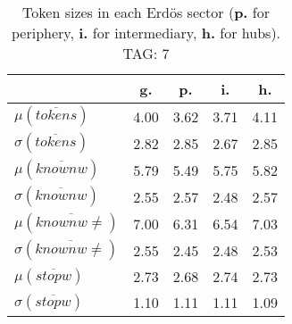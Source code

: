 \begin{table}[h!]
\begin{center}
\begin{tabular}{| l || c | c | c | c |}\hline
 & {\bf g.} & {\bf p.} & {\bf i.} & {\bf h.} \\\hline\hline
$\mu(\overline{tokens})$ & 4.00  & 3.62  & 3.71  & 4.11 \\
$\sigma(\overline{tokens})$ & 2.82  & 2.85  & 2.67  & 2.85 \\\hline
$\mu(\overline{knownw})$ & 5.79  & 5.49  & 5.75  & 5.82 \\
$\sigma(\overline{knownw})$ & 2.55  & 2.57  & 2.48  & 2.57 \\\hline
$\mu(\overline{knownw \neq})$ & 7.00  & 6.31  & 6.54  & 7.03 \\
$\sigma(\overline{knownw \neq})$ & 2.55  & 2.45  & 2.48  & 2.53 \\\hline
$\mu(\overline{stopw})$ & 2.73  & 2.68  & 2.74  & 2.73 \\
$\sigma(\overline{stopw})$ & 1.10  & 1.11  & 1.11  & 1.09 \\\hline
\end{tabular}
\caption{Token sizes in each Erd\"os sector ({{\bf p.}} for periphery, {{\bf i.}} for intermediary, {{\bf h.}} for hubs). TAG: 7}
\end{center}
\end{table}